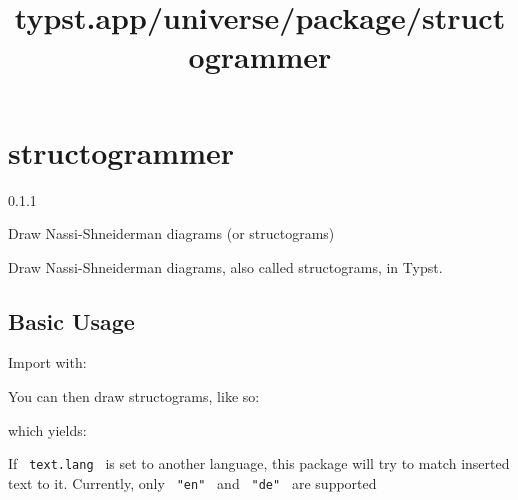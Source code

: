\title{typst.app/universe/package/structogrammer}

\label{banner}
\section{structogrammer}\label{structogrammer}

{ 0.1.1 }

Draw Nassi-Shneiderman diagrams (or structograms)

\label{readme}
Draw Nassi-Shneiderman diagrams, also called structograms, in Typst.

\subsection{Basic Usage}\label{basic-usage}

Import with:

\begin{Shaded}
\begin{Highlighting}[]
\end{Highlighting}
\end{Shaded}

You can then draw structograms, like so:

\begin{Shaded}
\begin{Highlighting}[]
\NormalTok{  (}
\NormalTok{      ))}
\NormalTok{    )),}
\NormalTok{  )}
\NormalTok{)}
\end{Highlighting}
\end{Shaded}

which yields:\\
\pandocbounded{}

If \texttt{\ text.lang\ } is set to another language, this package will
try to match inserted text to it. Currently, only \texttt{\ "en"\ } and
\texttt{\ "de"\ } are supported

